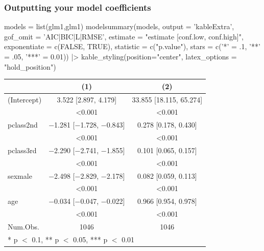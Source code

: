 \documentclass[a4paper]{article}
\begin{document}
\subsubsection{Outputting your model coefficients}
\begin{Schunk}
\begin{Sinput}
models = list(glm1,glm1)
modelsummary(models, output = 'kableExtra', gof_omit = 'AIC|BIC|L|RMSE', estimate = "{estimate} [{conf.low}, {conf.high}]", exponentiate = c(FALSE, TRUE), statistic = c("{p.value}"), stars = c('*' = .1, '**' = .05, '***' = 0.01)) |>
  kable_styling(position="center", latex_options = "hold_position")
\end{Sinput}
\begin{table}[!h]
\centering
\begin{tabular}[t]{lcc}
\toprule
  & (1) & (2)\\
\midrule
(Intercept) & \num{3.522} [\num{2.897}, \num{4.179}] & \num{33.855} [\num{18.115}, \num{65.274}]\\
 & \num{<0.001} & \vphantom{4} \num{<0.001}\\
pclass2nd & \num{-1.281} [\num{-1.728}, \num{-0.843}] & \num{0.278} [\num{0.178}, \num{0.430}]\\
 & \num{<0.001} & \vphantom{3} \num{<0.001}\\
pclass3rd & \num{-2.290} [\num{-2.741}, \num{-1.855}] & \num{0.101} [\num{0.065}, \num{0.157}]\\
 & \num{<0.001} & \vphantom{2} \num{<0.001}\\
sexmale & \num{-2.498} [\num{-2.829}, \num{-2.178}] & \num{0.082} [\num{0.059}, \num{0.113}]\\
 & \num{<0.001} & \vphantom{1} \num{<0.001}\\
age & \num{-0.034} [\num{-0.047}, \num{-0.022}] & \num{0.966} [\num{0.954}, \num{0.978}]\\
 & \num{<0.001} & \num{<0.001}\\
\midrule
Num.Obs. & \num{1046} & \num{1046}\\
\bottomrule
\multicolumn{3}{l}{\rule{0pt}{1em}* p $<$ 0.1, ** p $<$ 0.05, *** p $<$ 0.01}\\
\end{tabular}
\end{table}

\end{Schunk}
\end{document}
